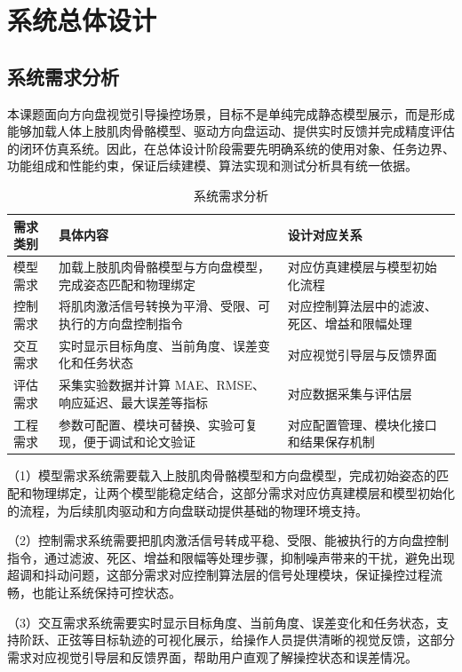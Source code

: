 \chapter{系统总体设计}
\section{系统需求分析}
本课题面向方向盘视觉引导操控场景，目标不是单纯完成静态模型展示，而是形成能够加载人体上肢肌肉骨骼模型、驱动方向盘运动、提供实时反馈并完成精度评估的闭环仿真系统。因此，在总体设计阶段需要先明确系统的使用对象、任务边界、功能组成和性能约束，保证后续建模、算法实现和测试分析具有统一依据。
\begin{table}
  \centering
  \caption{系统需求分析}
  \label{tab:system_requirements}
  \begin{tabular}{p{2cm}p{6.5cm}p{6.5cm}}
    \toprule
    需求类别 & 具体内容 & 设计对应关系 \\
    \midrule
     模型需求	& 加载上肢肌肉骨骼模型与方向盘模型，完成姿态匹配和物理绑定 & 对应仿真建模层与模型初始化流程 \\
     控制需求	& 将肌肉激活信号转换为平滑、受限、可执行的方向盘控制指令	& 对应控制算法层中的滤波、死区、增益和限幅处理 \\
     交互需求	& 实时显示目标角度、当前角度、误差变化和任务状态	& 对应视觉引导层与反馈界面 \\
     评估需求	& 采集实验数据并计算 MAE、RMSE、响应延迟、最大误差等指标	& 对应数据采集与评估层 \\
     工程需求	& 参数可配置、模块可替换、实验可复现，便于调试和论文验证	& 对应配置管理、模块化接口和结果保存机制 \\
    \bottomrule
  \end{tabular}
\end{table}


（1）模型需求系统需要载入上肢肌肉骨骼模型和方向盘模型，完成初始姿态的匹配和物理绑定，让两个模型能稳定结合，这部分需求对应仿真建模层和模型初始化的流程，为后续肌肉驱动和方向盘联动提供基础的物理环境支持。

（2）控制需求系统需要把肌肉激活信号转成平稳、受限、能被执行的方向盘控制指令，通过滤波、死区、增益和限幅等处理步骤，抑制噪声带来的干扰，避免出现超调和抖动问题，这部分需求对应控制算法层的信号处理模块，保证操控过程流畅，也能让系统保持可控状态。

（3）交互需求系统需要实时显示目标角度、当前角度、误差变化和任务状态，支持阶跃、正弦等目标轨迹的可视化展示，给操作人员提供清晰的视觉反馈，这部分需求对应视觉引导层和反馈界面，帮助用户直观了解操控状态和误差情况。

